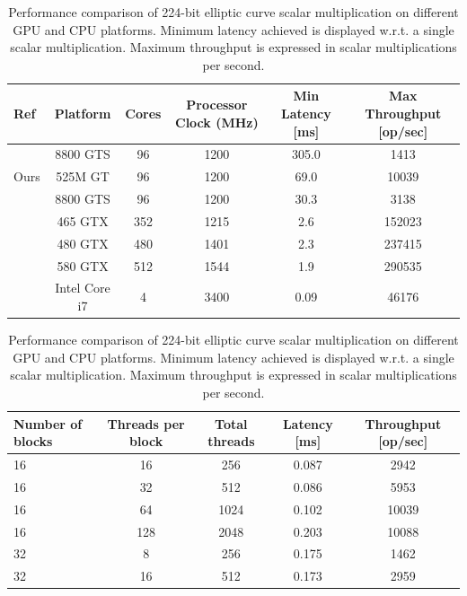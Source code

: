 \documentclass[11pt,twocolumn]{IEEEtran}
\begin{document}
\begin{table}
\small
\centering
\begin{tabular}{ l | c | c | c| | c |c }
  
    Ref & Platform & Cores &Processor Clock (MHz) & Min Latency [ms]& Max Throughput [op/sec]\\ \hline
    \cite{iambetterthanthem}  & 8800 GTS & 96 & 1200 &  305.0 & 1413 \\ \hline
    Ours & 525M GT &  96 & 1200 &  69.0 & 10039 \\ \hline
    \cite{antao} &   8800 GTS & 96 & 1200 &  30.3 & 3138 \\ \hline
    \cite{bos} &  465 GTX & 352 & 1215 & 2.6 & 152023 \\
 \cite{bos} &  480 GTX & 480 & 1401 & 2.3 & 237415 \\
\cite{bos} &  580 GTX & 512 & 1544 & 1.9 & 290535  \\

 \hline
\cite{kasper} &  Intel Core i7 & 4 & 3400 & 0.09 & 46176  \\
  \end{tabular}
\caption{\footnotesize{Performance comparison of 224-bit elliptic curve scalar multiplication on different GPU and CPU platforms. Minimum latency achieved is displayed w.r.t. a single scalar multiplication. Maximum throughput is expressed in scalar multiplications per second.}}
\label{tab:spectable}

\small

\begin{tabular}{ l | c | c| | c | c  }
  
    Number of blocks
 & Threads per block
 & Total threads
 &Latency [ms] & Throughput [op/sec]\\ \hline
  
16 & 16 & 256
 & 0.087
 & 2942  \\


16 & 32 & 512
 & 0.086
 & 5953  \\

16 & 64 & 1024
 & 0.102
 & 10039  \\

16 & 128 & 2048
 &0.203
 & 10088


  \\


 \hline
32 & 8 & 256
 & 0.175
 & 1462


  \\
32 & 16 & 512
 &0.173

 & 2959



\end{tabular}
\end{table}
\end{document}
